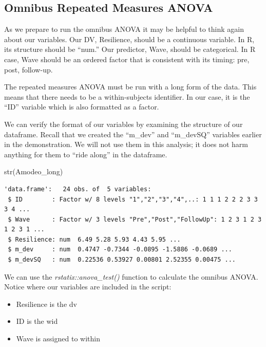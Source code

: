 \documentclass[
  11pt,
]{book}
\newenvironment{Shaded}{\begin{snugshade}}{\end{snugshade}}
\newcommand{\FunctionTok}[1]{\textcolor[rgb]{0.00,0.00,0.00}{#1}}
\newcommand{\NormalTok}[1]{#1}
\providecommand{\tightlist}{%
  \setlength{\itemsep}{0pt}\setlength{\parskip}{0pt}}
\begin{document}
\hypertarget{omnibus-repeated-measures-anova}{%
\subsection{Omnibus Repeated Measures ANOVA}\label{omnibus-repeated-measures-anova}}

As we prepare to run the omnibus ANOVA it may be helpful to think again about our variables. Our DV, Resilience, should be a continuous variable. In R, its structure should be ``num.'' Our predictor, Wave, should be categorical. In R case, Wave should be an ordered factor that is consistent with its timing: pre, post, follow-up.

The repeated measures ANOVA must be run with a long form of the data. This means that there needs to be a within-subjects identifier. In our case, it is the ``ID'' variable which is also formatted as a factor.

We can verify the format of our variables by examining the structure of our dataframe. Recall that we created the ``m\_dev'' and ``m\_devSQ'' variables earlier in the demonstration. We will not use them in this analysis; it does not harm anything for them to ``ride along'' in the dataframe.

\begin{Shaded}
\begin{Highlighting}[]
\FunctionTok{str}\NormalTok{(Amodeo\_long)}
\end{Highlighting}
\end{Shaded}

\begin{verbatim}
'data.frame':   24 obs. of  5 variables:
 $ ID        : Factor w/ 8 levels "1","2","3","4",..: 1 1 1 2 2 2 3 3 3 4 ...
 $ Wave      : Factor w/ 3 levels "Pre","Post","FollowUp": 1 2 3 1 2 3 1 2 3 1 ...
 $ Resilience: num  6.49 5.28 5.93 4.43 5.95 ...
 $ m_dev     : num  0.4747 -0.7344 -0.0895 -1.5886 -0.0689 ...
 $ m_devSQ   : num  0.22536 0.53927 0.00801 2.52355 0.00475 ...
\end{verbatim}

We can use the \emph{rstatix::anova\_test()} function to calculate the omnibus ANOVA. Notice where our variables are included in the script:

\begin{itemize}
\tightlist
\item
  Resilience is the dv
\item
  ID is the wid
\item
  Wave is assigned to within
\end{itemize}
\end{document}
